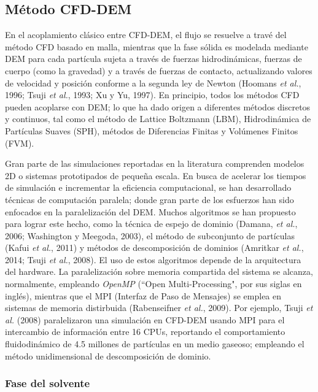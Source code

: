 \subsection{M\'etodo CFD-DEM}

\noindent
\justify

En el acoplamiento cl\'asico entre CFD-DEM, el flujo se resuelve a trav\'e del m\'etodo CFD basado en malla, mientras que la fase s\'olida es modelada mediante DEM para cada part\'icula sujeta a trav\'es de fuerzas hidrodin\'amicas, fuerzas de cuerpo (como la gravedad) y a trav\'es de fuerzas de contacto, actualizando valores de velocidad y posici\'on conforme a la segunda ley de Newton (Hoomans \textit{et al.}, 1996; Tsuji \textit{et al.}, 1993; Xu y Yu, 1997). En principio, todos los m\'etodos CFD pueden acoplarse con DEM; lo que ha dado origen a diferentes m\'etodos discretos y continuos, tal como el m\'etodo de Lattice Boltzmann (LBM), Hidrodin\'amica de Part\'iculas Suaves (SPH), m\'etodos de Diferencias Finitas y Vol\'umenes Finitos (FVM).

\noindent
\justify

Gran parte de las simulaciones reportadas en la literatura comprenden modelos 2D o sistemas prototipados de peque\~na escala. En busca de acelerar los tiempos de simulaci\'on e incrementar la eficiencia computacional, se han desarrollado t\'ecnicas de computaci\'on paralela; donde gran parte de los esfuerzos han sido enfocados en la paralelizaci\'on del DEM. Muchos algoritmos se han propuesto para lograr este hecho, como la t\'ecnica de espejo de dominio (Damana, \textit{et al.}, 2006; Washington y Meegoda, 2003), el m\'etodo de subconjunto de part\'iculas (Kafui \textit{et al.}, 2011) y m\'etodos de descomposici\'on de dominios (Amritkar \textit{et al.}, 2014; Tsuji \textit{et al.}, 2008). El uso de estos algoritmos depende de la arquitectura del hardware. La paralelizaci\'on sobre memoria compartida del sistema se alcanza, normalmente, empleando \textit{OpenMP} (``Open Multi-Processing", por sus siglas en ingl\'es), mientras que el MPI (Interfaz de Paso de Mensajes) se emplea en sistemas de memoria distirbuida (Rabenseifner \textit{et al.}, 2009). Por ejemplo, Tsuji \textit{et al.} (2008) paralelizaron una simulaci\'on en CFD-DEM usando MPI para el intercambio de informaci\'on entre 16 CPUs, reportando el comportamiento fluidodin\'amico de 4.5 millones de part\'iculas en un medio gaseoso; empleando el m\'etodo unidimensional de descomposici\'on de dominio.

\subsubsection{Fase del solvente}

